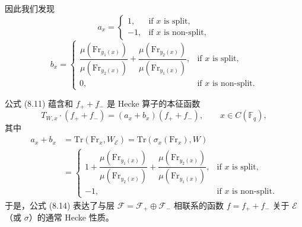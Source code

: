 因此我们发现
\begin{equation}\tag{8.12}
a_x = \begin{cases} 1, & \text{if } x \text{ is split},\\ -1, & \text{if } x \text{ is non-split},\end{cases}
\end{equation}
\begin{equation}\tag{8.13}
b_x = \begin{cases} \dfrac{\mu(\mathrm{Fr}_{y_1(x)})}{\mu(\mathrm{Fr}_{y_2(x)})} + \dfrac{\mu(\mathrm{Fr}_{y_2(x)})}{\mu(\mathrm{Fr}_{y_1(x)})}, & \text{if } x \text{ is split},\\[10pt] 0, & \text{if } x \text{ is non-split}.\end{cases}
\end{equation}


公式 (8.11) 蕴含和 $f_+ + f_-$ 是 Hecke 算子的本征函数
\begin{equation}\tag{8.14}
T_{W,x}\cdot (f_+ + f_-) = (a_x + b_x)(f_+ + f_-), \qquad x\in C(\mathbb{F}_q),
\end{equation}
其中
\begin{equation}\tag{8.15}
\begin{aligned}
a_x + b_x &= \mathrm{Tr}(\mathrm{Fr}_x, W_{\mathcal{E}}) = \mathrm{Tr}(\sigma_x(\mathrm{Fr}_x), W)\\
&= \begin{cases} 1 + \dfrac{\mu(\mathrm{Fr}_{y_1(x)})}{\mu(\mathrm{Fr}_{y_2(x)})} + \dfrac{\mu(\mathrm{Fr}_{y_2(x)})}{\mu(\mathrm{Fr}_{y_1(x)})}, & \text{if } x \text{ is split},\\[10pt] -1, & \text{if } x \text{ is non-split}.\end{cases}
\end{aligned}
\end{equation}
于是，公式 (8.14) 表达了与层 $\mathcal{F} = \mathcal{F}_+ \oplus \mathcal{F}_-$ 相联系的函数 $f = f_+ + f_-$ 关于 $\mathcal{E}$（或 $\sigma$）的通常 Hecke 性质。

